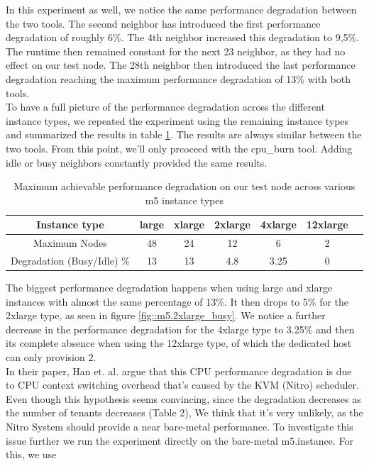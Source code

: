 \noindent
In this experiment as well, we notice the same performance degradation between the two tools. The second 
neighbor has introduced the first performance degradation of roughly 6\%. The 4th neighbor increased 
this degradation to 9,5\%. The runtime then remained constant for the next 23 neighbor, as they had no 
effect on our test node. The 28th neighbor then introduced the last performance degradation reaching the 
maximum performance degradation of 13\% with both tools. \\
To have a full picture of the performance degradation across the different instance types, we repeated 
the experiment using the remaining instance types and summarized the results in table \ref{tab::all_m5}.
The results are always similar between the two tools. From this point, we'll only prcoceed 
with the cpu\_burn tool. Adding idle or busy neighbors constantly provided the same results. 
\begin{table}[H]
\centering
\begin{tabular}{ |c|c|c|c|c|c|c }
 Instance type & large & xlarge & 2xlarge & 4xlarge  & 12xlarge  \\
 \hline
 Maximum Nodes & 48 & 24 & 12 & 6 & 2 \\
 \hline
Degradation (Busy/Idle) \% & 13 & 13 & 4.8 & 3.25 & 0  \\ 

\end{tabular}
\caption{Maximum achievable performance degradation on our test node across various m5 instance types}
\label{tab::all_m5}
\end{table}
\noindent
The biggest performance degradation happens when using large and xlarge instances with almost the same 
percentage of 13\%. It then drops to 5\% for the 2xlarge type, as seen in figure \ref{fig::m5.2xlarge_busy}.
We notice a further decrease in the performance degradation for the 4xlarge type to 3.25\% and then its complete 
absence when using the 12xlarge type, of which the dedicated host can only provision 2. \\
In their paper, Han et. al. \cite{contention} argue that this CPU performance degradation is due to CPU 
context switching overhead that's caused by the KVM (Nitro) scheduler. Even though this hypothesis 
seems convincing, since the degradation decreases as the number of tenants decreases (Table 2), 
We think that it's very unlikely, as the Nitro System should provide a near bare-metal performance. 
To investigate this issue further we run the experiment directly on the bare-metal m5.instance. For this, we use 
